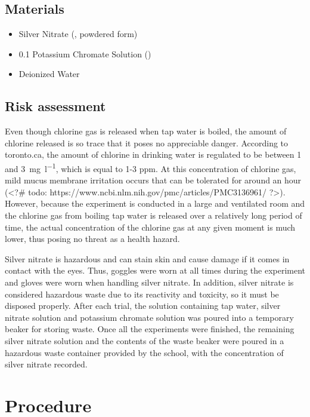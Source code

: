 \documentclass[11pt]{article}
\begin{document}
\subsection{Materials}

\begin{itemize}
	\item Silver Nitrate (, powdered form)
	\item 0.1 \mpl Potassium Chromate Solution ()
	\item Deionized Water
\end{itemize}

\subsection{Risk assessment}

Even though chlorine gas is released when tap water is boiled, the amount of chlorine released is so trace that it poses no appreciable danger. According to toronto.ca, the amount of chlorine in drinking water is regulated to be between 1 and \SI{3}{\mg\per\litre}, which is equal to 1-3 ppm. At this concentration of chlorine gas, mild mucus membrane irritation occurs that can be tolerated for around an hour (<?# todo: https://www.ncbi.nlm.nih.gov/pmc/articles/PMC3136961/ ?>). However, because the experiment is conducted in a large and ventilated room and the chlorine gas from boiling tap water is released over a relatively long period of time, the actual concentration of the chlorine gas at any given moment is much lower, thus posing no threat as a health hazard.

Silver nitrate is hazardous and can stain skin and cause damage if it comes in contact with the eyes. Thus, goggles were worn at all times during the experiment and gloves were worn when handling silver nitrate. In addition, silver nitrate is considered hazardous waste due to its reactivity and toxicity, so it must be disposed properly. After each trial, the solution containing tap water, silver nitrate solution and potassium chromate solution was poured into a temporary beaker for storing waste. Once all the experiments were finished, the remaining silver nitrate solution and the contents of the waste beaker were poured in a hazardous waste container provided by the school, with the concentration of silver nitrate recorded.




\section{Procedure}
\end{document}
